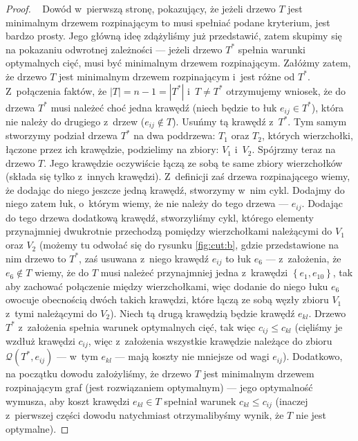 \begin{proof}~\cite[$518$]{Ahuja:1993:NFT:137406}
	Dowód w~pierwszą stronę, pokazujący, że jeżeli drzewo $T$ jest minimalnym drzewem rozpinającym to musi spełniać podane kryterium, jest bardzo prosty.
	Jego główną ideę zdążyliśmy już przedstawić, zatem skupimy się na pokazaniu odwrotnej zależności --- jeżeli drzewo $T^{\ast}$ spełnia warunki optymalnych cięć, musi być minimalnym drzewem rozpinającym.
	Załóżmy zatem, że drzewo $T$ jest minimalnym drzewem rozpinającym i~jest różne od $T^{\ast}$.
	Z~połączenia faktów, że $\left| T \right| = n - 1 = \left| T^{\ast} \right|$ i~$T \neq T^{\ast}$ otrzymujemy wniosek, że do drzewa $T^{\ast}$ musi należeć choć jedna krawędź (niech będzie to łuk $e_{ij} \in T^{\ast}$), która nie należy do drugiego z~drzew ($e_{ij} \notin T$).
	Usuńmy tą krawędź z~$T^{\ast}$.
	Tym samym stworzymy podział drzewa $T^{\ast}$ na dwa poddrzewa: $T_{1}$ oraz $T_{2}$, których wierzchołki, łączone przez ich krawędzie, podzielimy na zbiory: $V_{1}$ i~$V_{2}$.
	Spójrzmy teraz na drzewo $T$.
	Jego krawędzie oczywiście łączą ze sobą te same zbiory wierzchołków (składa się tylko z~innych krawędzi).
	Z~definicji zaś drzewa rozpinającego wiemy, że dodając do niego jeszcze jedną krawędź, stworzymy w~nim cykl.
	Dodajmy do niego zatem łuk, o~którym wiemy, że nie należy do tego drzewa --- $e_{ij}$.
	Dodając do tego drzewa dodatkową krawędź, stworzyliśmy cykl, którego elementy przynajmniej dwukrotnie przechodzą pomiędzy wierzchołkami należącymi do $V_{1}$ oraz $V_{2}$ (możemy tu odwołać się do rysunku \ref{fig:cut:b}, gdzie przedstawione na nim drzewo to $T^{\ast}$, zaś usuwana z~niego krawędź $e_{ij}$ to łuk $e_{6}$ --- z~założenia, że $e_{6} \notin T$ wiemy, że do $T$ musi należeć przynajmniej jedna z~krawędzi $\left\{ e_{1}, e_{10} \right\}$, tak aby zachować połączenie między wierzchołkami, więc dodanie do niego łuku $e_{6}$ owocuje obecnością dwóch takich krawędzi, które łączą ze sobą węzły zbioru $V_{1}$ z~tymi należącymi do $V_{2}$).
	Niech tą drugą krawędzią będzie krawędź $e_{kl}$.
	Drzewo $T^{\ast}$ z~założenia spełnia warunek optymalnych cięć, tak więc $c_{ij} \leqslant c_{kl}$ (cięliśmy je wzdłuż krawędzi $c_{ij}$, więc z~założenia wszystkie krawędzie należące do zbioru $\mathcal{Q} \left( T^{\ast}, e_{ij} \right)$ --- w~tym $e_{kl}$ --- mają koszty nie mniejsze od wagi $e_{ij}$).
	Dodatkowo, na początku dowodu założyliśmy, że drzewo $T$ jest minimalnym drzewem rozpinającym graf (jest rozwiązaniem optymalnym) --- jego optymalność wymusza, aby koszt krawędzi $e_{kl} \in T$ spełniał warunek $c_{kl} \leqslant c_{ij}$ (inaczej z~pierwszej części dowodu natychmiast otrzymalibyśmy wynik, że $T$ nie jest optymalne).

\end{proof}

